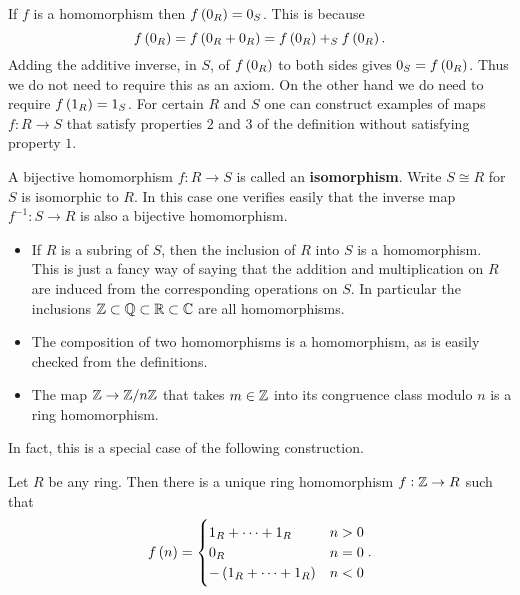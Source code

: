 \begin{note*}
If $ f $ is a homomorphism then $ f\br{0_R} = 0_S $. This is because
$$ f\br{0_R} = f\br{0_R + 0_R} = f\br{0_R} +_S f\br{0_R}. $$
Adding the additive inverse, in $ S $, of $ f\br{0_R} $ to both sides gives $ 0_S = f\br{0_R} $. Thus we do not need to require this as an axiom. On the other hand we do need to require $ f\br{1_R} = 1_S $. For certain $ R $ and $ S $ one can construct examples of maps $ f : R \to S $ that satisfy properties $ 2 $ and $ 3 $ of the definition without satisfying property $ 1 $.
\end{note*}

\begin{definition}
A bijective homomorphism $ f : R \to S $ is called an \textbf{isomorphism}. Write $ S \cong R $ for $ S $ is isomorphic to $ R $. In this case one verifies easily that the inverse map $ f^{-1} : S \to R $ is also a bijective homomorphism.
\end{definition}

\begin{example*}
\hfill
\begin{itemize}
\item If $ R $ is a subring of $ S $, then the inclusion of $ R $ into $ S $ is a homomorphism. This is just a fancy way of saying that the addition and multiplication on $ R $ are induced from the corresponding operations on $ S $. In particular the inclusions $ \mathbb{Z} \subset \mathbb{Q} \subset \mathbb{R} \subset \mathbb{C} $ are all homomorphisms.
\item The composition of two homomorphisms is a homomorphism, as is easily checked from the definitions.
\item The map $ \mathbb{Z} \to \mathbb{Z} / n\mathbb{Z} $ that takes $ m \in \mathbb{Z} $ into its congruence class modulo $ n $ is a ring homomorphism.
\end{itemize}
\end{example*}

In fact, this is a special case of the following construction.

\begin{proposition}
Let $ R $ be any ring. Then there is a unique ring homomorphism $ f : \mathbb{Z} \to R $ such that
$$ f\br{n} =
\begin{cases}
1_R + \dots + 1_R & n > 0 \\
0_R & n = 0 \\
-\br{1_R + \dots + 1_R} & n < 0
\end{cases}.
$$
\end{proposition}

